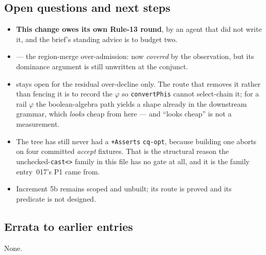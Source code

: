 \subsection*{Open questions and next steps}
\begin{itemize}
  \item \textbf{This change owes its own Rule-13 round}, by an agent that did not write it, and
        the brief's standing advice is to budget two.
  \item {} --- the region-merge over-admission: now \emph{covered} by
        the observation, but its dominance argument is still unwritten at the conjunct.
  \item {} stays open for the residual over-decline only. The route
        that removes it rather than fencing it is to record the \(\varphi\) so
        \texttt{convertPhis} cannot select-chain it; for a rail \(\varphi\) the boolean-algebra
        path yields a shape already in the downstream grammar, which \emph{looks} cheap from
        here --- and ``looks cheap'' is not a measurement.
  \item The tree has still never had a \texttt{+Asserts} \texttt{cq-opt}, because building one
        aborts on four committed \emph{accept} fixtures. That is the structural reason the
        unchecked-\texttt{cast<>} family in this file has no gate at all, and it is the family
        entry~017's P1 came from.
  \item Increment 5b remains scoped and unbuilt; its route is proved and its predicate is not
        designed.
\end{itemize}

\subsection*{Errata to earlier entries}
None.
